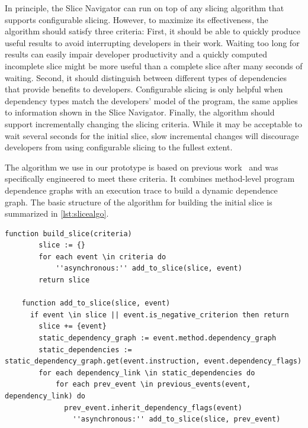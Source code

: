 \documentclass[
			english,
			]{elsarticle}
\begin{document}
In principle, the Slice Navigator can run on top of any slicing algorithm that supports configurable slicing.
However, to maximize its effectiveness, the algorithm should satisfy three criteria:
First, it should be able to quickly produce useful results to avoid interrupting developers in their work.
Waiting too long for results can easily impair developer productivity and a quickly computed incomplete slice might be more useful than a complete slice after many seconds of waiting.
Second, it should distinguish between different types of dependencies that provide benefits to developers.
Configurable slicing is only helpful when dependency types match the developers' model of the program, the same applies to information shown in the Slice Navigator.
Finally, the algorithm should support incrementally changing the slicing criteria.
While it may be acceptable to wait several seconds for the initial slice, slow incremental changes will discourage developers from using configurable slicing to the fullest extent.

The algorithm we use in our prototype is based on previous work~\cite{treffer_dynamic_2014} and was specifically engineered to meet these criteria.
It combines method-level program dependence graphs with an execution trace to build a dynamic dependence graph.
The basic structure of the algorithm for building the initial slice is summarized in \cref{lst:slicealgo}.

\begin{lstlisting}[float=t,language=algorithm,label=lst:slicealgo,caption={Simplified algorithm for building the slice}]
	function build_slice(criteria)
		slice := {}
		for each event \in criteria do
			''asynchronous:'' add_to_slice(slice, event)
		return slice
		
	function add_to_slice(slice, event)
	  if event \in slice || event.is_negative_criterion then return
		slice += {event}
		static_dependency_graph := event.method.dependency_graph
		static_dependencies := static_dependency_graph.get(event.instruction, event.dependency_flags)
		for each dependency_link \in static_dependencies do
			for each prev_event \in previous_events(event, dependency_link) do
			  prev_event.inherit_dependency_flags(event)
				''asynchronous:'' add_to_slice(slice, prev_event)
\end{lstlisting}
\end{document}
